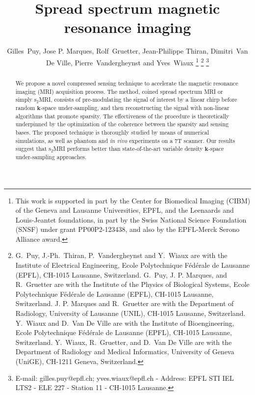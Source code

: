 \documentclass[10pt,draftcls, onecolumn]{IEEEtran}
\begin{document}
\title{Spread spectrum magnetic resonance imaging}
\author{Gilles~Puy, Jose P. Marques, Rolf~Gruetter, Jean-Philippe Thiran, Dimitri~Van De Ville, Pierre~Vandergheynst and Yves~Wiaux
\thanks{This work is supported in part by the Center for Biomedical Imaging (CIBM) of the Geneva and Lausanne Universities, EPFL, and the Leenaards and Louis-Jeantet foundations, in part by the Swiss National Science Foundation (SNSF) under grant PP00P2-123438, and also by the EPFL-Merck Serono Alliance award.}
\thanks{G.~Puy, J.-Ph.~Thiran, P.~Vandergheynst and Y.~Wiaux are with the Institute of Electrical Engineering,  Ecole Polytechnique F{\'e}d{\'e}rale de Lausanne (EPFL), CH-1015 Lausanne, Switzerland. G.~Puy, J. P. Marques, and R.~Gruetter are with the Institute of the Physics of Biological Systems,  Ecole Polytechnique F{\'e}d{\'e}rale de Lausanne (EPFL), CH-1015 Lausanne, Switzerland. J. P. Marques and R.~Gruetter are with the Department of Radiology, University of Lausanne (UNIL), CH-1015 Lausanne, Switzerland. Y.~Wiaux and D.~Van De Ville are with the Institute of Bioengineering,  Ecole Polytechnique F{\'e}d{\'e}rale de Lausanne (EPFL), CH-1015 Lausanne, Switzerland. Y.~Wiaux, R.~Gruetter, and D.~Van De Ville are with the Department of Radiology and Medical Informatics, University of Geneva (UniGE), CH-1211 Geneva, Switzerland.}
\thanks{E-mail: gilles.puy@epfl.ch; yves.wiaux@epfl.ch - Address: EPFL STI IEL LTS2 - ELE 227 - Station 11 - CH-1015 Lausanne.}} 

\maketitle

\begin{abstract}
We propose a novel compressed sensing technique to accelerate the magnetic resonance imaging (MRI) acquisition process. The method, coined spread spectrum MRI or simply s$_2$MRI, consists of pre-modulating the signal of interest by a linear chirp before random $\bm{k}$-space under-sampling, and then reconstructing the signal with non-linear algorithms that promote sparsity. The effectiveness of the procedure is theoretically underpinned by the optimization of the coherence between the sparsity and sensing bases. The proposed technique is thoroughly studied by means of numerical simulations, as well as phantom and \emph{in vivo} experiments on a 7T scanner. Our results suggest that s$_2$MRI performs better than state-of-the-art variable density $\bm{k}$-space under-sampling approaches.
\end{abstract}
\end{document}
